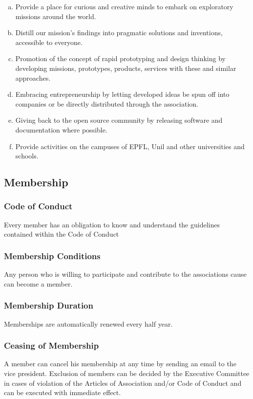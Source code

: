 \documentclass[12pt,a4paper,oneside]{article}
\newcounter{art}
\newcommand{\english}{    \switchcolumn[0]\noindent}
\begin{document}
\begin{paracol}{2}
	\begin{enumerate}[(a)]

	\item Provide a place for curious and creative minds to embark on exploratory missions around the world.
	\item Distill our mission's findings into pragmatic solutions and inventions, accessible to everyone. 
	\item Promotion of the concept of rapid prototyping and design thinking by developing missions, prototypes, products, services with these and similar approaches.
	\item Embracing entrepreneurship by letting developed ideas be spun off into companies or be directly distributed through the association.
	\item Giving back to the open source community by releasing software and documentation where possible.
	\item Provide activities on the campuses of EPFL, Unil and other universities and schools.

	\end{enumerate}



\english
	\subsection{Membership}

\english
	\subsubsection{Code of Conduct}
	Every member has an obligation to know and understand the guidelines contained within the Code of Conduct


\english
	\subsubsection{Membership Conditions}
	Any person who is willing to participate and contribute to the associations cause can become a member.

\english
	\subsubsection{Membership Duration}
	Memberships are automatically renewed every half year.


\english
	\subsubsection{Ceasing of Membership}
	A member can cancel his membership at any time by sending an email to the vice president. Exclusion of members can be decided by the Executive Committee in cases of violation of the Articles of Association and/or Code of Conduct and can be executed with immediate effect.


\end{paracol}
\end{document}
